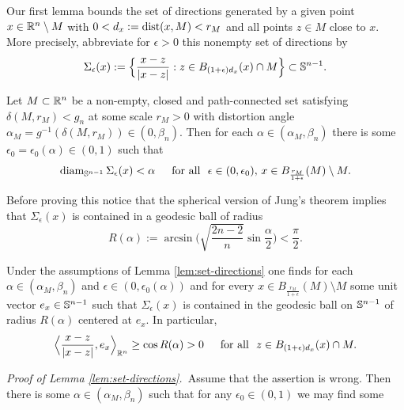 Our first lemma bounds the set of directions generated by a 
given point $x\in\R^n
\setminus M$ with $0<d_x:=\dist(x,M)<r_M$ and all points $z\in M$ close to $x$.
More precisely, abbreviate for $\epsilon >0$ this nonempty 
set of directions by
\begin{equation}\label{eq:set-directions}
\Sigma_\epsilon(x)
:=\Big\{\frac{x-z}{|x-z|}:z\in B_{(1+\epsilon)d_x}(x)\cap M\Big\}\subset\S^{n-1}.
\end{equation}
\begin{lemma}
\label{lem:set-directions}
Let $M\subset\R^n$ be a non-empty, closed and path-connected set satisfying
$\delta(M,r_M)<g_n$ at some scale $r_M>0$ with distortion angle $\alpha_M
=g^{-1}(\delta(M,r_M))\in 
(0,\beta_n)$.
Then for each $\alpha\in (\alpha_M,\beta_n)$ 
there is some $\epsilon_0=\epsilon_0(\alpha)
\in (0,1)$ such that
\begin{equation}\label{eq:diam-sigma}
\diam_{\S^{n-1}}\Sigma_\epsilon(x) <\alpha\quad\Foa \epsilon\in (0,\epsilon_0),\,
x\in B_{\frac{r_M}{1+\epsilon}}(M)\setminus M.
\end{equation}
\end{lemma}
Before proving this notice that the spherical version of Jung's theorem 
\cite[Theorem~2]{dekster_1995}
implies 
that $\Sigma_\epsilon(x)$ is contained in a geodesic ball
of radius
\begin{equation}\label{eq:geodesic-radius}
R(\alpha):=\arcsin\Big(\sqrt{\frac{2n-2}n}\sin\frac{\alpha}2\Big)<\frac{\pi}2.
\end{equation}
\begin{corollary}
\label{cor:common-direction}
Under the assumptions of Lemma \ref{lem:set-directions} one finds for each
$\alpha\in (\alpha_M,\beta_n)$ and
$\epsilon\in (0,\epsilon_0(\alpha))$ and for
every $x\in B_{\frac{r_M}{1+\epsilon}}(M)\setminus M$
some unit vector $e_x\in\S^{n-1}$ such that $\Sigma_\epsilon(x)$ is contained
in the geodesic ball on $\S^{n-1}$ of radius $R(\alpha)$  centered at $e_x$. 
In particular,
\begin{equation}\label{eq:common-direction}
\Big\langle \frac{x-z}{|x-z|},e_x\Big\rangle_{\R^n}\ge \cos R(\alpha)>0
\quad\Foa z\in B_{(1+\epsilon)d_x}(x)\cap M.
\end{equation}
\end{corollary}
{\it Proof of Lemma \ref{lem:set-directions}.}\,
Assume that the assertion is wrong.
Then there is some $\alpha\in(\alpha_M,\beta_n)$ such that
for any $\epsilon_0\in(0,1)$ we may find some

